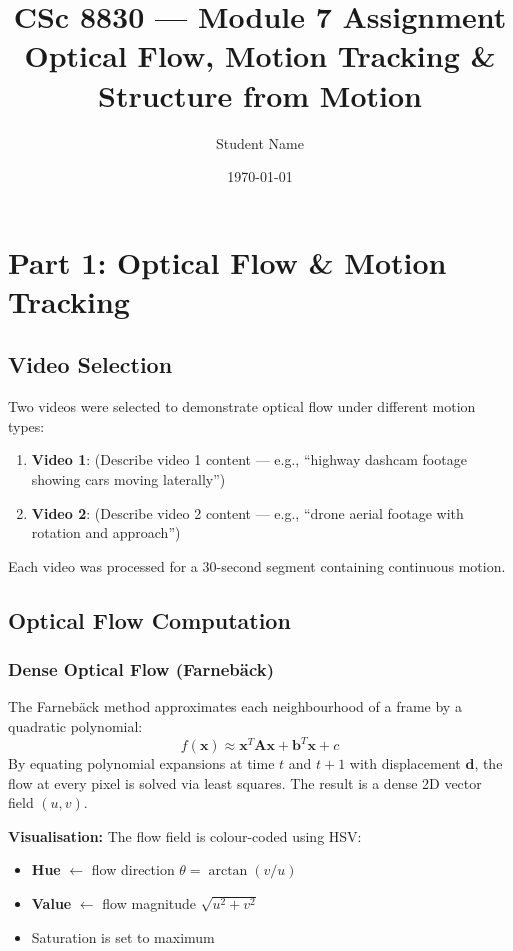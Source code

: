 \documentclass[12pt, a4paper]{article}
\title{CSc 8830 --- Module 7 Assignment\\
\large Optical Flow, Motion Tracking \& Structure from Motion}
\author{Student Name}
\date{\today}
\begin{document}
\maketitle
\tableofcontents
\newpage

\section{Part 1: Optical Flow \& Motion Tracking}

\subsection{Video Selection}

Two videos were selected to demonstrate optical flow under different motion types:

\begin{enumerate}
  \item \textbf{Video 1}: (Describe video 1 content --- e.g., ``highway dashcam footage showing cars moving laterally'')
  \item \textbf{Video 2}: (Describe video 2 content --- e.g., ``drone aerial footage with rotation and approach'')
\end{enumerate}

Each video was processed for a 30-second segment containing continuous motion.

\subsection{Optical Flow Computation}

\subsubsection{Dense Optical Flow (Farneb\"ack)}

The Farneb\"ack method approximates each neighbourhood of a frame by a quadratic polynomial:
\[
  f(\mathbf{x}) \approx \mathbf{x}^T \mathbf{A} \mathbf{x} + \mathbf{b}^T \mathbf{x} + c
\]
By equating polynomial expansions at time $t$ and $t+1$ with displacement $\mathbf{d}$, the flow at every pixel is solved via least squares.  The result is a dense 2D vector field $(u, v)$.

\textbf{Visualisation:} The flow field is colour-coded using HSV:
\begin{itemize}
  \item \textbf{Hue} $\leftarrow$ flow direction $\theta = \arctan(v/u)$
  \item \textbf{Value} $\leftarrow$ flow magnitude $\sqrt{u^2 + v^2}$
  \item Saturation is set to maximum
\end{itemize}
\end{document}
